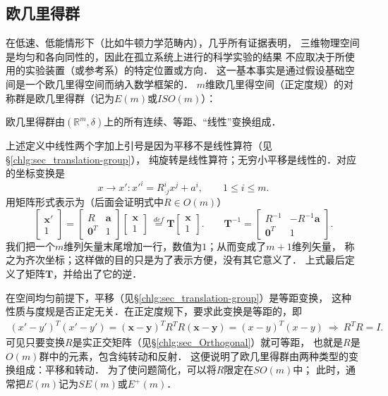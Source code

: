 \subsection{欧几里得群}\label{chlg:sec_Euclidean-group}
在低速、低能情形下（比如牛顿力学范畴内），几乎所有证据表明，
三维物理空间是均匀和各向同性的，因此在孤立系统上进行的科学实验的结果
不应取决于所使用的实验装置（或参考系）的特定位置或方向．
这一基本事实是通过假设基础空间是一个欧几里得空间而纳入数学框架的．
$m$维欧几里得空间（正定度规）的对称群是欧几里得群（记为$E(m)$或$ISO(m)$）：
\begin{definition}
    欧几里得群由$(\mathbb{R}^m,\delta)$上的所有连续、等距、“线性”变换组成．
\end{definition}
上述定义中线性两个字加上引号是因为平移不是线性算符（见\S\ref{chlg:sec_translation-group}），
纯旋转是线性算符；无穷小平移是线性的．对应的坐标变换是
\begin{equation}\label{chlg:eqn_trans-rot}
    x\to x' : x'^{i} = R^i_{\cdot j}x^j + a^i ,\qquad  1 \leqslant i \leqslant m .
\end{equation}
用矩阵形式表示为（后面会证明式中$R\in O(m)$）
\begin{equation}\label{chlg:eqn_Em-max}
    \begin{bmatrix}  \boldsymbol{x}' \\ 1 \end{bmatrix} =
    \begin{bmatrix}  R & \boldsymbol{a} \\ \boldsymbol{0}^T & 1  \end{bmatrix}
    \begin{bmatrix}  \boldsymbol{x} \\ 1 \end{bmatrix} 
    \  \overset{def}{=} \boldsymbol{T} \begin{bmatrix}  \boldsymbol{x} \\ 1 \end{bmatrix} .
    \qquad \boldsymbol{T}^{-1} = 
    \begin{bmatrix}    R^{-1} & -R^{-1} \boldsymbol{a} \\ \boldsymbol{0}^T & 1    \end{bmatrix} .
\end{equation}
我们把一个$m$维列矢量末尾增加一行，数值为$1$；从而变成了$m+1$维列矢量，
称之为{\heiti 齐次坐标}；这样做的目的只是为了表示方便，没有其它意义了．
上式最后定义了矩阵$\boldsymbol{T}$，并给出了它的逆．

在空间均匀前提下，平移（见\S\ref{chlg:sec_translation-group}）是等距变换，
这种性质与度规是否正定无关．在正定度规下，要求此变换是等距的，即
\begin{align*}
    (x'-y')^T (x'-y') = ( \boldsymbol{x} - \boldsymbol{y} )^T R^T  R ( \boldsymbol{x} - \boldsymbol{y} )
    = (x-y)^T (x-y) \ \Rightarrow\ R^T R = I .
\end{align*}
可见只要变换$R$是实正交矩阵（见\S\ref{chlg:sec_Orthogonal}）就可等距，
也就是$R$是$O(m)$群中的元素，包含纯转动和反射．
这便说明了欧几里得群由两种类型的变换组成：平移和转动．
为了使问题简化，可以将$R$限定在$SO(m)$中；
此时，通常把$E(m)$记为$SE(m)$或$E^+ (m)$．

